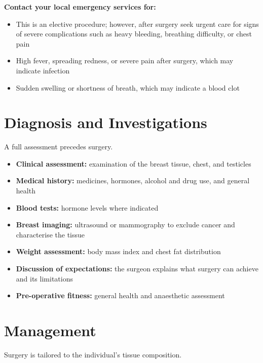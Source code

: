 \textbf{Contact your local emergency services for:}
\begin{itemize}
    \item This is an elective procedure; however, after surgery seek urgent care for signs of severe complications such as heavy bleeding, breathing difficulty, or chest pain
    \item High fever, spreading redness, or severe pain after surgery, which may indicate infection
    \item Sudden swelling or shortness of breath, which may indicate a blood clot
\end{itemize}

\section*{Diagnosis and Investigations}
A full assessment precedes surgery.

\begin{itemize}
    \item \textbf{Clinical assessment:} examination of the breast tissue, chest, and testicles
    \item \textbf{Medical history:} medicines, hormones, alcohol and drug use, and general health
    \item \textbf{Blood tests:} hormone levels where indicated
    \item \textbf{Breast imaging:} ultrasound or mammography to exclude cancer and characterise the tissue
    \item \textbf{Weight assessment:} body mass index and chest fat distribution
    \item \textbf{Discussion of expectations:} the surgeon explains what surgery can achieve and its limitations
    \item \textbf{Pre-operative fitness:} general health and anaesthetic assessment
\end{itemize}

\section*{Management}
Surgery is tailored to the individual's tissue composition.


